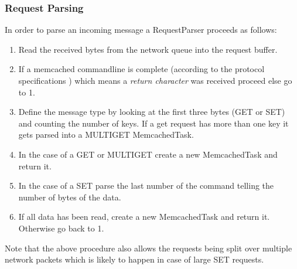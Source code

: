 \documentclass[11pt,a4paper]{article}
\let\ti\textit
\begin{document}
\subsubsection*{Request Parsing}
In order to parse an incoming message a RequestParser proceeds as follows:

\begin{enumerate}
    \item Read the received bytes from the network queue into the request buffer.
    \item If a memcached commandline is complete (according to the protocol specifications \cite{memcached_protocol}) which means a \ti{return character} was received  proceed else go to 1.
    \item Define the message type by looking at the first three bytes (GET or SET) and counting the number of keys. If a get request has more than one key it gets parsed into a MULTIGET MemcachedTask.
    \item In the case of a GET or MULTIGET create a new MemcachedTask and return it.
    \item In the case of a SET parse the last number of the command telling the number of bytes of the data.
    \item If all data has been read, create a new MemcachedTask and return it. Otherwise go back to 1.
    
\end{enumerate}

Note that the above procedure also allows the requests being split over multiple network packets which is likely to happen in case of large SET requests. 
\end{document}
